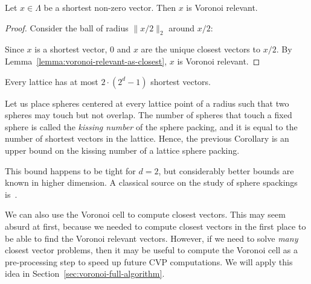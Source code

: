 \begin{lemma}
  Let $x \in \Lambda$ be a shortest non-zero vector.
  Then $x$ is Voronoi relevant.
\end{lemma}
\begin{proof}
  Consider the ball of radius $\|x/2\|_2$ around $x/2$:
  \begin{center}
  \end{center}
  Since $x$ is a shortest vector, $0$ and $x$ are the unique closest vectors to $x/2$.
  By Lemma~\ref{lemma:voronoi-relevant-as-closest}, $x$ is Voronoi relevant.
\end{proof}

\begin{corollary}
  Every lattice has at most $2 \cdot (2^d - 1)$ shortest vectors.
\end{corollary}

\begin{remark}
  Let us place spheres centered at every lattice point of a radius
  such that two spheres may touch but not overlap.
  The number of spheres that touch a fixed sphere is called the \emph{kissing number}
  of the sphere packing,
  and it is equal to the number of shortest vectors in the lattice.
  Hence, the previous Corollary is an upper bound on the kissing number
  of a lattice sphere packing.

  This bound happens to be tight for $d = 2$,
  but considerably better bounds are known in higher dimension.
  A classical source on the study of sphere spackings is~\cite{MR1662447}.
\end{remark}

We can also use the Voronoi cell to compute closest vectors.
This may seem absurd at first,
because we needed to compute closest vectors in the first place to be able to
find the Voronoi relevant vectors.
However, if we need to solve \emph{many} closest vector problems,
then it may be useful to compute the Voronoi cell as a pre-processing step
to speed up future CVP computations.
We will apply this idea in Section~\ref{sec:voronoi-full-algorithm}.

